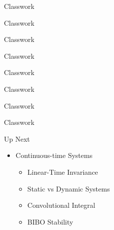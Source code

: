 \documentclass[aspectratio=169,xcolor=dvipsnames,svgnames,x11names,fleqn]{beamer}
\begin{document}
\begin{frame}{Classwork}
    
\end{frame}
\begin{frame}{Classwork}
    
\end{frame}
\begin{frame}{Classwork}
    
\end{frame}
\begin{frame}{Classwork}
    
\end{frame}
\begin{frame}{Classwork}
    
\end{frame}
\begin{frame}{Classwork}
    
\end{frame}
\begin{frame}{Classwork}
    
\end{frame}
\begin{frame}{Classwork}
    
\end{frame}

\begin{frame}{Up Next}
\begin{itemize}
    \item Continuous-time Systems
    \begin{itemize}
        \item Linear-Time Invariance
        \item Static vs Dynamic Systems
        \item Convolutional Integral
        \item BIBO Stability
    \end{itemize}
\end{itemize}
    
\end{frame}
\end{document}
